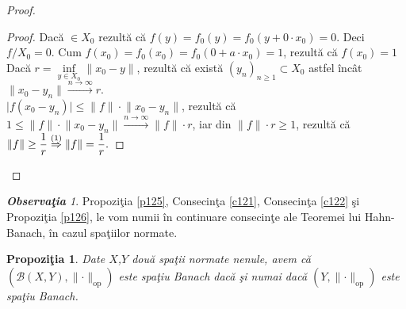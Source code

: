 \documentclass[ a4paper, 12pt]{report}
\newtheorem{prop}[theorem]{\bf Propozi\c tia }
\theoremstyle{definition}
\theoremstyle{remark}
\newtheorem{obs}{\bf Observa\c tia }[section]
\numberwithin{equation}{section}
\begin{document}
\begin{proof}
 \begin{proof}
 Dac\u a $ \in X_0$ rezult\u a c\u a $f(y) = f_0(y) = f_0(y + 0 \cdot x_0) = 0$. Deci $f/X_0 = 0$.
 Cum $f(x_0) = f_0(x_0) = f_0(0 + a \cdot x_0) = 1$, rezult\u a  c\u a $f(x_0) = 1$\\
 Dac\u a $r = \inf\limits_{y \in X_0} \lVert x_0 - y  \rVert$, rezult\u a c\u a exist\u a $(y_n)_{n \geq 1} \subset X_0$ astfel \^inc\^at \\ $\lVert x_0 - y_n \rVert \stackrel{n \rightarrow \infty}{\longrightarrow} r.$\\
 $\lvert f(x_0 - y_n)  \rvert \leq \lVert f  \rVert \cdot \lVert x_0 - y_n \rVert$, rezult\u a c\u a $1 \leq \lVert f \rVert \cdot \lVert x_0 - y_n \rVert \stackrel{n \rightarrow \infty}{\longrightarrow} \lVert f  \rVert \cdot r$, iar din $\lVert f \rVert \cdot r \geq 1$, rezult\u a c\u a $\lVert f \rVert \geq \displaystyle\frac{1}{r} \stackrel{(1)}{\Rightarrow} \lVert f \rVert = \frac{1}{r}. $
 \end{proof}
\end{proof}
\begin{obs}
Propozi\c tia \ref{p125}, Consecin\c ta \ref{c121}, Consecin\c ta \ref{c122} \c si Propozi\c tia \ref{p126}, le vom numii \^in continuare consecin\c te ale Teoremei lui Hahn-Banach, \^in cazul spa\c tiilor normate.
\end{obs}
\begin{prop}
Date $X$,$Y$ dou\u a spa\c tii normate nenule, avem c\u a $(\mathcal{B}(X,Y), \lVert \cdot \rVert_{\mbox{op}}) $ este spa\c tiu Banach dac\u a \c si numai dac\u a $(Y, \lVert \cdot \rVert_{\mbox{op}})$ este spa\c tiu Banach.
\end{prop}
\end{document}
